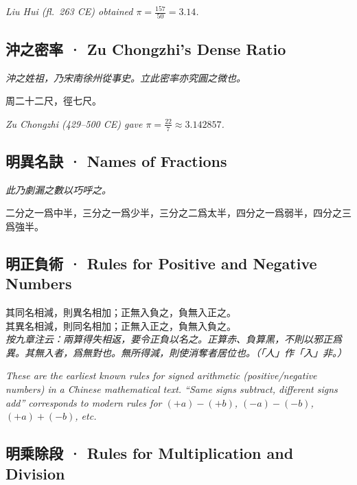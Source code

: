 \documentclass[11pt,a4paper]{article}
\newcommand{\cnote}[1]{\textcolor{notecolor}{\textit{#1}}}
\begin{document}
\cnote{Liu Hui (fl.\ 263 CE) obtained $\pi = \frac{157}{50} = 3.14$.}

\subsection{沖之密率 · Zu Chongzhi's Dense Ratio}

\textit{沖之姓祖，乃宋南徐州從事史。立此密率亦究圓之微也。}

\noindent
周二十二尺，徑七尺。

\cnote{Zu Chongzhi (429--500 CE) gave $\pi = \frac{22}{7} \approx 3.142857$.}

\subsection{明異名訣 · Names of Fractions}

\textit{此乃劇漏之數以巧呼之。}

\noindent
二分之一爲中半，三分之一爲少半，三分之二爲太半，四分之一爲弱半，四分之三爲強半。

\subsection{明正負術 · Rules for Positive and Negative Numbers}

\noindent
其同名相減，則異名相加；正無入負之，負無入正之。\\[2pt]
其異名相減，則同名相加；正無入正之，負無入負之。\\[2pt]
\textit{按九章注云：兩算得失相返，要令正負以名之。正算赤、負算黑，不則以邪正爲異。其無入者，爲無對也。無所得減，則使消奪者居位也。（「人」作「入」非。）}

\cnote{These are the earliest known rules for signed arithmetic (positive/negative numbers)
in a Chinese mathematical text. ``Same signs subtract, different signs add'' corresponds
to modern rules for $(+a)-(+b)$, $(-a)-(-b)$, $(+a)+(-b)$, etc.}

\subsection{明乘除段 · Rules for Multiplication and Division}
\end{document}
